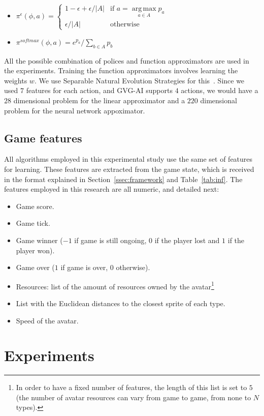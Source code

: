 \documentclass[conference]{IEEEtran}
\DeclareMathOperator*{\argmax}{arg\,max}
\newenvironment{mitems}
{\begin{itemize}
\setlength{\itemsep}{1pt}
\setlength{\parskip}{0pt}
\setlength{\parsep}{0pt}}{\end{itemize}}
\newcommand{\twopartdefo}[3]
{
  \left\{
    \begin{array}{ll}
      #1 & \mbox{if } #2 \\
      #3 & \mbox{otherwise}
    \end{array}
  \right.
}
\begin{document}
\begin{itemize}
\item $\pi^\epsilon(\phi,a) = \twopartdefo{ 1-\epsilon + \epsilon/|A| }{ a = \argmax\limits_{a \in A}  p_a}{\epsilon/|A|}$
\item $\pi^{softmax}(\phi,a) = e^{p_a}/ \sum\limits_{b \in A} p_b $
\end{itemize}

All the possible combination of polices and function approximators are used in the experiments. Training the function approximators involves learning the weights $w$. We use Separable Natural Evolution Strategies for this~\cite{schaul2011high}. Since we used $7$ features for each action, and GVG-AI supports $4$ actions, we would have a $28$ dimensional problem for the linear approximator and a $220$ dimensional problem for the neural network appoximator.  

\subsection{Game features} \label{ssec:feat}

All algorithms employed in this experimental study use the same set of features for learning. These features are  extracted from the game state, which is received in the format explained in Section~\ref{ssec:framework} and Table~\ref{tab:inf}. The features employed in this research are all numeric, and detailed next:

\begin{mitems}
\item Game score.
\item Game tick.
\item Game winner ($-1$ if game is still ongoing, $0$ if the player lost and $1$ if the player won).
\item Game over ($1$ if game is over, $0$ otherwise).
\item Resources: list of the amount of resources owned by the avatar\footnote{In order to have a fixed number of features, the length of this list is set to $5$ (the number of avatar resources can vary from game to game, from none to $N$ types).}
\item List with the Euclidean distances to the closest sprite of each type. 
\item Speed of the avatar.
\end{mitems}





\section{Experiments} \label{sec:exp}
\end{document}

